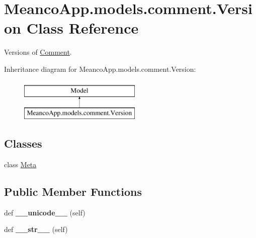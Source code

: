 \hypertarget{class_meanco_app_1_1models_1_1comment_1_1_version}{}\section{Meanco\+App.\+models.\+comment.\+Version Class Reference}
\label{class_meanco_app_1_1models_1_1comment_1_1_version}


Versions of \hyperlink{class_meanco_app_1_1models_1_1comment_1_1_comment}{Comment}.  


Inheritance diagram for Meanco\+App.\+models.\+comment.\+Version\+:\begin{figure}[H]
\begin{center}
\leavevmode
\includegraphics[height=2.000000cm]{class_meanco_app_1_1models_1_1comment_1_1_version}
\end{center}
\end{figure}
\subsection*{Classes}
\begin{DoxyCompactItemize}
\item 
class \hyperlink{class_meanco_app_1_1models_1_1comment_1_1_version_1_1_meta}{Meta}
\end{DoxyCompactItemize}
\subsection*{Public Member Functions}
\begin{DoxyCompactItemize}
\item 
\hypertarget{class_meanco_app_1_1models_1_1comment_1_1_version_a3cb00a54aad9748186ca19964926c356}{}\label{class_meanco_app_1_1models_1_1comment_1_1_version_a3cb00a54aad9748186ca19964926c356} 
def {\bfseries \+\_\+\+\_\+unicode\+\_\+\+\_\+} (self)
\item 
\hypertarget{class_meanco_app_1_1models_1_1comment_1_1_version_a8c7d3e21be63b2c30259654c70b7e2f4}{}\label{class_meanco_app_1_1models_1_1comment_1_1_version_a8c7d3e21be63b2c30259654c70b7e2f4} 
def {\bfseries \+\_\+\+\_\+str\+\_\+\+\_\+} (self)
\end{DoxyCompactItemize}
